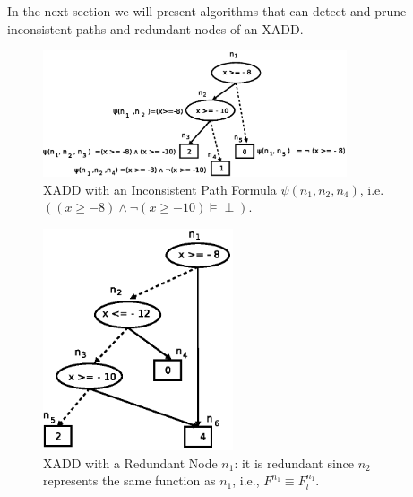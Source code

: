 \documentclass[twoside,11pt]{article}
\begin{document}
In the next  section we will present algorithms that can detect and prune inconsistent paths and redundant nodes of an XADD. 


\begin{figure}[t!]
\centering
\includegraphics[width=0.8\textwidth]{FiguresSource/consistency.eps}
%
%
\vspace{-2mm}
\caption{%
XADD with an Inconsistent Path Formula $\psi(n_1, n_2, n_4)$, i.e. $((x \geq -8) \wedge \neg (x \geq -10) \models\perp)$. 
}
\label{fig:inconsistent_XADD}
\end{figure}


\begin{figure}[t!]
\centering
\includegraphics[width=0.5\textwidth]{FiguresSource/redundancy.eps}
\vspace{-2mm}
\caption{%
XADD with a Redundant Node $n_1$: it is redundant since $n_2$ represents the same function as $n_1$, i.e., $F^{n_1} \equiv F^{n_1}_l$.}
\label{fig:redundant_XADD}
\end{figure}
\end{document}
